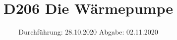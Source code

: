 

\subject{Versuch Nr.1}
\title{D206 Die Wärmepumpe}
\date{%
  Durchführung: 28.10.2020
  \hspace{3em}
  Abgabe: 02.11.2020
}



\maketitle
\thispagestyle{empty}
\tableofcontents
\newpage






\nocite{*}

\printbibliography{}


